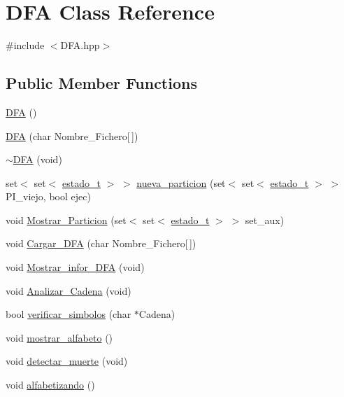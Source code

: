 \hypertarget{classDFA}{\section{D\-F\-A Class Reference}
\label{classDFA}
}


{\ttfamily \#include $<$D\-F\-A.\-hpp$>$}

\subsection*{Public Member Functions}
\begin{DoxyCompactItemize}
\item 
\hyperlink{classDFA_a0739bd751a325dd162604ed63fadea69}{D\-F\-A} ()
\item 
\hyperlink{classDFA_a8ea9d7e634546e4138c011d5b4e47e3d}{D\-F\-A} (char Nombre\-\_\-\-Fichero\mbox{[}$\,$\mbox{]})
\item 
\hyperlink{classDFA_aa6398a02d0f2d3a57cee0c7d8b3ec9e1}{$\sim$\-D\-F\-A} (void)
\item 
set$<$ set$<$ \hyperlink{classestado__t}{estado\-\_\-t} $>$ $>$ \hyperlink{classDFA_a427b050f652917a2ef10c6f0bcc62feb}{nueva\-\_\-particion} (set$<$ set$<$ \hyperlink{classestado__t}{estado\-\_\-t} $>$ $>$ P\-I\-\_\-viejo, bool ejec)
\item 
void \hyperlink{classDFA_acbe2cc4d41a1e30a8c185b262189ac71}{Mostrar\-\_\-\-Particion} (set$<$ set$<$ \hyperlink{classestado__t}{estado\-\_\-t} $>$ $>$ set\-\_\-aux)
\item 
void \hyperlink{classDFA_a0e252de663175ef960d025d8b78cbc6d}{Cargar\-\_\-\-D\-F\-A} (char Nombre\-\_\-\-Fichero\mbox{[}$\,$\mbox{]})
\item 
void \hyperlink{classDFA_aa5259d18788a67e78b21be91dbadc88f}{Mostrar\-\_\-infor\-\_\-\-D\-F\-A} (void)
\item 
void \hyperlink{classDFA_a056c38fca9a65b60acea799ebe9b743b}{Analizar\-\_\-\-Cadena} (void)
\item 
bool \hyperlink{classDFA_a58c2890860965eb2c1dc337f667f92e5}{verificar\-\_\-simbolos} (char $\ast$Cadena)
\item 
void \hyperlink{classDFA_a169da2171e0e1182cd1da0948df45172}{mostrar\-\_\-alfabeto} ()
\item 
void \hyperlink{classDFA_abaac46234616f0feda45b0a91ce78d39}{detectar\-\_\-muerte} (void)
\item 
void \hyperlink{classDFA_a3b9768781e98480f0f9677fadb3eb78e}{alfabetizando} ()
\item 

\end{DoxyCompactItemize}
